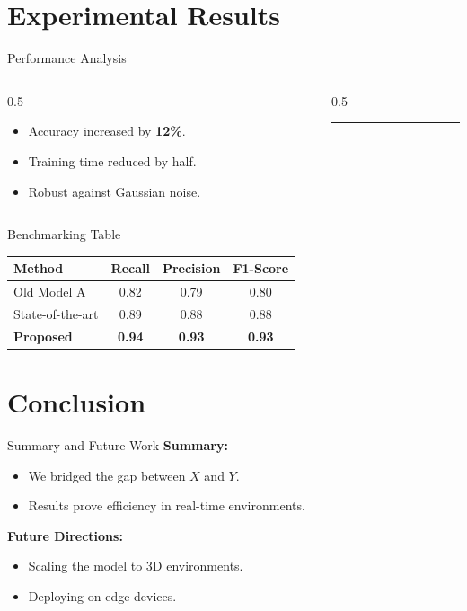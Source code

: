 \documentclass[10pt, aspectratio=169]{beamer} %
\begin{document}
\section{Experimental Results}

\begin{frame}{Performance Analysis}
    \begin{columns}
        \begin{column}{0.5\textwidth}
            \begin{itemize}
                \item Accuracy increased by \textbf{12\%}.
                \item Training time reduced by half.
                \item Robust against Gaussian noise.
            \end{itemize}
        \end{column}
        \begin{column}{0.5\textwidth}
            \centering
            \rule{4cm}{3cm} 
        \end{column}
    \end{columns}
\end{frame}

\begin{frame}{Benchmarking Table}
    \centering
    \begin{tabular}{lccc}
        \toprule
        \textbf{Method} & \textbf{Recall} & \textbf{Precision} & \textbf{F1-Score} \\
        \midrule
        Old Model A & 0.82 & 0.79 & 0.80 \\
        State-of-the-art & 0.89 & 0.88 & 0.88 \\
        \textbf{Proposed} & \textbf{0.94} & \textbf{0.93} & \textbf{0.93} \\
        \bottomrule
    \end{tabular}
\end{frame}

\section{Conclusion}

\begin{frame}{Summary and Future Work}
    \textbf{Summary:}
    \begin{itemize}
        \item We bridged the gap between $X$ and $Y$.
        \item Results prove efficiency in real-time environments.
    \end{itemize}
    \pause
    \textbf{Future Directions:}
    \begin{itemize}
        \item Scaling the model to 3D environments.
        \item Deploying on edge devices.
    \end{itemize}
\end{frame}
\end{document}
